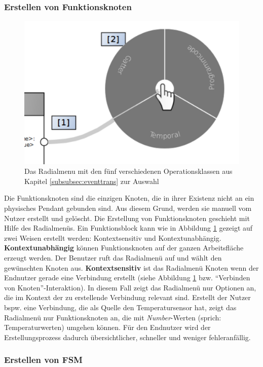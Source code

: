 \subsubsection{Erstellen von Funktionsknoten}

\begin{figure}[h]
  \centering
  \includegraphics[width=.6\textwidth]{bilder/chapter4/chapter4_3/createNodes.pdf}
  \caption{Das Radialmenu mit den fünf verschiedenen Operationsklassen aus Kapitel \ref{subsubsec:eventtrans} zur Auswahl}
  \label{fig:createNodesInteraction}
\end{figure}
Die Funktionsknoten sind die einzigen Knoten, die in ihrer Existenz nicht an ein physisches Pendant gebunden sind. Aus diesem Grund, werden sie manuell vom Nutzer erstellt und gelöscht. Die Erstellung von Funktionsknoten geschieht mit Hilfe des Radialmenüs. Ein Funktionsblock kann wie in Abbildung \ref{fig:createNodesInteraction} gezeigt auf zwei Weisen erstellt werden: Kontextsensitiv und Kontextunabhängig. \textbf{Kontextunabhängig} können Funktionsknoten auf der ganzen Arbeitsfläche erzeugt werden. Der Benutzer ruft das Radialmenü auf und wählt den gewünschten Knoten aus. \textbf{Kontextsensitiv} ist das Radialmenü Knoten wenn der Endnutzer gerade eine Verbindung erstellt (siehe Abbildung \ref{fig:createNodesInteraction} bzw.  "`Verbinden von Knoten"'-Interaktion). In diesem Fall zeigt das Radialmenü nur Optionen an, die im Kontext der zu erstellende Verbindung relevant sind. Erstellt der Nutzer bspw. eine Verbindung, die als Quelle den Temperatursensor hat, zeigt das Radialmenü nur Funktionsknoten an, die mit \textit{Number}-Werten (sprich: Temperaturwerten) umgehen können. Für den Endnutzer wird der Erstellungsprozess dadurch übersichtlicher, schneller und weniger fehleranfällig.

\subsubsection{Erstellen von \ac{FSM}}\label{FSMkreieren}



